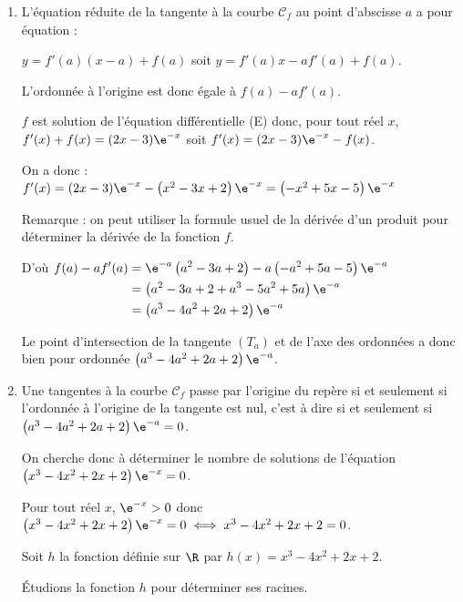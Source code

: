 	\begin{enumerate}
		\item  L'équation réduite de la tangente à la courbe $\mathcal{C}_{f}$ au point d'abscisse $a$ a pour équation :

		$y=f'(a) (x-a) +f(a) $ soit $y= f'(a) x -af'(a) +f(a)$.

		L'ordonnée à l'origine est donc égale à $f(a) -af'(a)$.


		$f$ est solution de l'équation différentielle (E)  donc, pour tout réel $x$, $f'(x) +f(x) = (2x-3) \e^{-x}$
		soit $f'(x)=  (2x-3) \e^{-x} -f(x)$.

		On a donc : $f'(x) = (2x-3) \e^{-x} - \left( x^2-3x+2\right) \e ^{-x} = \left( -x^2+5x-5\right) \e ^{-x}$

		Remarque : on peut utiliser la formule usuel de la dérivée d'un produit pour déterminer la dérivée de la fonction $f$.

		D'où $\begin{aligned}[t] f(a) - af' (a) &= \e^{-a} \left( a^2 -3a+2\right) -a \left( -a^2+5a-5\right) \e ^{-a}\\
			&= \left( a^2 -3a +2 +a^3 -5a^2+5a\right) \e ^{-a}\\
			&= \left(  a^3-4  a^2 +2a +2\right) \e ^{-a}\\
		\end{aligned}$



		Le point d'intersection de la tangente $(T_{a})$ et de l'axe des ordonnées a donc bien  pour ordonnée $\left(a^{3}-4 a^{2}+2 a+2\right) \e^{-a}$.

		\item Une tangentes à la courbe $\mathcal{C}_{f}$ passe par l'origine du repère si et seulement si  l'ordonnée à l'origine de la tangente est nul, c'est à dire si et seulement si $\left(a^{3}-4 a^{2}+2 a+2\right) \e^{-a}=0$.

		On cherche donc à déterminer le nombre de solutions de l'équation $\left(x^{3}-4 x^{2}+2 x+2\right) \e^{-x}=0$.

		Pour tout réel $x$, $\e ^{-x} >0$ donc  $\left(x^{3}-4 x^{2}+2 x+2\right) \e^{-x}=0 \iff x^{3}-4 x^{2}+2 x+2=0$.

		\bigskip

		Soit $h$ la fonction définie sur $\R$ par $h(x) = x^{3}-4 x^{2}+2 x+2$.

		Étudions la fonction $h$  pour déterminer ses racines.

		\bigskip


\end{enumerate}
